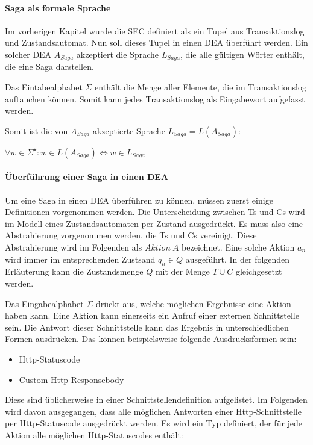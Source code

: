 \paragraph{Saga als formale Sprache}
Im vorherigen Kapitel wurde die SEC definiert als ein Tupel aus Transaktionslog und Zustandsautomat. Nun soll dieses Tupel in einen DEA überführt werden. Ein solcher DEA $A_{Saga}$ akzeptiert die Sprache $L_{Saga}$, die alle gültigen Wörter enthält, die eine Saga darstellen.

Das Eintabealphabet $\Sigma$ enthält die Menge aller Elemente, die im Transaktionslog auftauchen können. Somit kann jedes Transaktionslog als Eingabewort aufgefasst werden. 

Somit ist die von $A_{Saga}$ akzeptierte Sprache $L_{Saga} = L(A_{Saga})$: \\

\begin{center}
$\forall w \in \Sigma^{\star}: w \in L(A_{Saga}) \iff w \in L_{Saga}$
\end{center}

\paragraph{Überführung einer Saga in einen DEA}
Um eine Saga in einen DEA überführen zu können, müssen zuerst einige Definitionen vorgenommen werden. Die Unterscheidung zwischen Ts und Cs wird im Modell eines Zustandsautomaten per Zustand ausgedrückt. Es muss also eine Abstrahierung vorgenommen werden, die Ts und Cs vereinigt. Diese Abstrahierung wird im Folgenden als $Aktion\ A$ bezeichnet. Eine solche Aktion $a_n$ wird immer im entsprechenden Zustsand $q_n \in Q$ ausgeführt. In der folgenden Erläuterung kann die Zustandsmenge $Q$ mit der Menge $T \cup C$ gleichgesetzt werden.

Das Eingabealphabet $\Sigma$ drückt aus, welche möglichen Ergebnisse eine Aktion haben kann. Eine Aktion kann einerseits ein Aufruf einer externen Schnittstelle sein. Die Antwort dieser Schnittstelle kann das Ergebnis in unterschiedlichen Formen ausdrücken. Das können beispielsweise folgende Ausdrucksformen sein:
\begin{itemize}
	\item Http-Statuscode
	\item Custom Http-Responsebody
\end{itemize}
Diese sind üblicherweise in einer Schnittstellendefinition aufgelistet. Im Folgenden wird davon ausgegangen, dass alle möglichen Antworten einer Http-Schnittstelle per Http-Statuscode ausgedrückt werden. Es wird ein Typ definiert, der für jede Aktion alle möglichen Http-Statuscodes enthält: 

